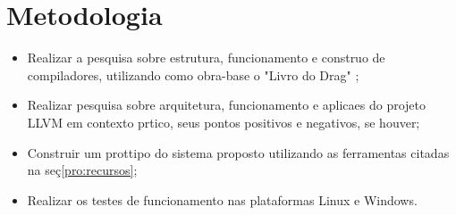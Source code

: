 \chapter{Metodologia}

\label{pro:metodologia}

\begin{itemize}
  \item Realizar a pesquisa sobre estrutura, funcionamento e constru\ca o de compiladores, utilizando como obra-base o "Livro do Drag\ao" \cite{Aho08};
  \item Realizar pesquisa sobre arquitetura, funcionamento e aplica\co es do projeto LLVM em contexto pr\ah tico, seus pontos positivos e negativos, se houver;
  \item Construir um prot\oh tipo do sistema proposto utilizando as ferramentas citadas na se\c{c}\ao \ref{pro:recursos};
  \item Realizar os testes de funcionamento nas plataformas Linux e Windows.
\end{itemize}

